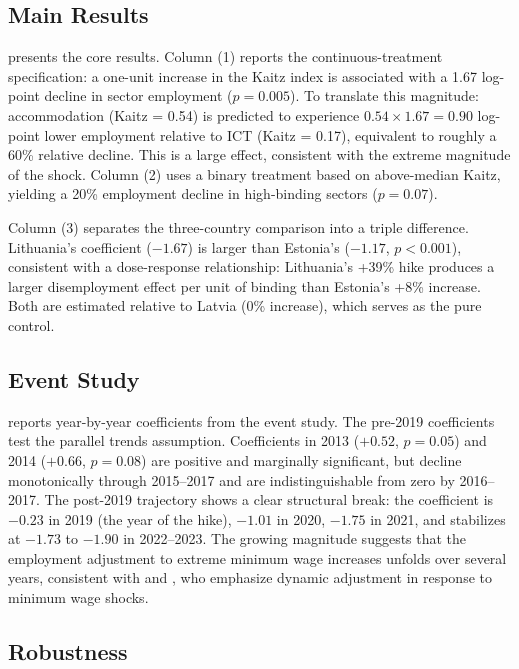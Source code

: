 \documentclass[12pt]{article}
\begin{document}
\subsection{Main Results}



 presents the core results. Column (1) reports the continuous-treatment specification: a one-unit increase in the Kaitz index is associated with a 1.67 log-point decline in sector employment ($p = 0.005$). To translate this magnitude: accommodation (Kaitz = 0.54) is predicted to experience $0.54 \times 1.67 = 0.90$ log-point lower employment relative to ICT (Kaitz = 0.17), equivalent to roughly a 60\% relative decline. This is a large effect, consistent with the extreme magnitude of the shock. Column (2) uses a binary treatment based on above-median Kaitz, yielding a 20\% employment decline in high-binding sectors ($p = 0.07$).

Column (3) separates the three-country comparison into a triple difference. Lithuania's coefficient ($-1.67$) is larger than Estonia's ($-1.17$, $p < 0.001$), consistent with a dose-response relationship: Lithuania's +39\% hike produces a larger disemployment effect per unit of binding than Estonia's +8\% increase. Both are estimated relative to Latvia (0\% increase), which serves as the pure control.

\subsection{Event Study}



 reports year-by-year coefficients from the event study. The pre-2019 coefficients test the parallel trends assumption. Coefficients in 2013 ($+0.52$, $p = 0.05$) and 2014 ($+0.66$, $p = 0.08$) are positive and marginally significant, but decline monotonically through 2015--2017 and are indistinguishable from zero by 2016--2017. The post-2019 trajectory shows a clear structural break: the coefficient is $-0.23$ in 2019 (the year of the hike), $-1.01$ in 2020, $-1.75$ in 2021, and stabilizes at $-1.73$ to $-1.90$ in 2022--2023. The growing magnitude suggests that the employment adjustment to extreme minimum wage increases unfolds over several years, consistent with \citet{sorkin2015minimum} and \citet{meer2016effects}, who emphasize dynamic adjustment in response to minimum wage shocks.

\subsection{Robustness}
\end{document}
